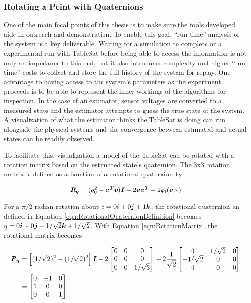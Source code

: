 \subsubsection{Rotating a Point with Quaternions}
\label{subsubsec:RotatingaPointwithQuaternions}

One of the main focal points of this thesis is to make sure the tools developed aide in outreach and demonstration.  To enable this goal, ``run-time'' analysis of the system is a key deliverable.  Waiting for a simulation to complete or a experimental run with TableSat before being able to access the information is not only an impedance to this end, but it also introduces complexity and higher ``run-time'' costs to collect and store the full history of the system for replay.  One advantage to having access to the system's parameters as the experiment proceeds is to be able to represent the inner workings of the algorithms for inspection.  In the case of an estimator, sensor voltages are converted to a measured state and the estimator attempts to guess the true state of the system.  A visualization of what the estimator thinks the TableSat is doing can run alongside the physical systems and the convergence between estimated and actual states can be readily observed.

To facilitate this, visualization a model of the TableSat can be rotated with a rotation matrix based on the estimated state's quaternion.  The 3x3 rotation matrix is defined as a function of a rotational quaternion by

\begin{equation}
  \boldsymbol{R_q} = (q_0^2 - \boldsymbol{v}^T \boldsymbol{v}) \boldsymbol{I} + 2 \boldsymbol{v} \boldsymbol{v}^T - 2 q_0 (\boldsymbol{v} \times)
  \label{eqn:RotationMatrix}
\end{equation}

For a $\pi/2$ radian rotation about $\hat{e} = 0\boldsymbol{i}+0\boldsymbol{j}+1\boldsymbol{k}$, the rotational quaternion an defined in Equation \ref{eqn:RotationalQuaternionDefinition} becomes $q = 0\boldsymbol{i}+0\boldsymbol{j}-1/\sqrt{2}\boldsymbol{k}+1/\sqrt{2}$.  With Equation \ref{eqn:RotationMatrix}, the rotational matrix becomes

\begin{equation}
  \begin{aligned}
    \boldsymbol{R_q} & = \left[ (1/\sqrt{2})^2 - (1/\sqrt{2})^2 \right] \boldsymbol{I} + 2 \begin{bmatrix} 0 & 0 & 0 \\ 0 & 0 & 0 \\ 0 & 0 & 1/\sqrt{2} \end{bmatrix} - 2 \frac{1}{\sqrt{2}} \begin{bmatrix} 0 & 1/\sqrt{2} & 0 \\ -1/\sqrt{2} & 0 & 0 \\ 0 & 0 & 0 \\ \end{bmatrix} \\
      & = \begin{bmatrix} 0 & -1 & 0 \\ 1 & 0 & 0 \\ 0 & 0 & 1 \\\end{bmatrix}
  \end{aligned}
\end{equation}

